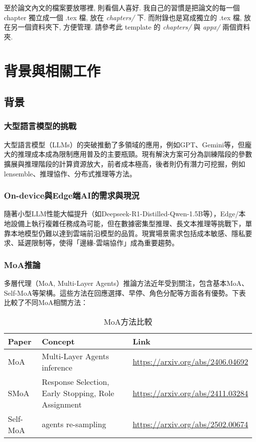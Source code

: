 至於論文內文的檔案要放哪裡, 則看個人喜好.
我自己的習慣是把論文的每一個 chapter 獨立成一個 .tex 檔, 放在 \textit{chapters/} 下.
而附錄也是寫成獨立的 .tex 檔, 放在另一個資料夾下, 方便管理.
請參考此 template 的 \textit{chapters/} 與 \textit{appx/} 兩個資料夾.

\chapter{背景與相關工作}

\section{背景}
\subsection{大型語言模型的挑戰}
大型語言模型（LLMs）的突破推動了多領域的應用，例如GPT、Gemini等，但龐大的推理成本成為限制應用普及的主要瓶頸。現有解決方案可分為訓練階段的參數擴展與推理階段的計算資源放大，前者成本極高，後者則仍有潛力可挖掘，例如lensemble、推理協作、分布式推理等方法。

\subsection{On-device與Edge端AI的需求與現況}
隨著小型LLM性能大幅提升（如Deepseek-R1-Distilled-Qwen-1.5B等），Edge/本地設備上執行複雜任務成為可能，但在數據密集型推理、長文本推理等挑戰下，單靠本地模型仍難以達到雲端前沿模型的品質。現實場景需求包括成本敏感、隱私要求、延遲限制等，使得「邊緣-雲端協作」成為重要趨勢。

\subsection{MoA推論}
多層代理（MoA, Multi-Layer Agents）推論方法近年受到關注，包含基本MoA、Self-MoA等架構。這些方法在回應選擇、早停、角色分配等方面各有優勢。下表比較了不同MoA相關方法：

\begin{table}[h]
\centering
\caption{MoA方法比較}
\begin{tabular}{|l|l|l|}
\hline
Paper & Concept & Link \\
\hline
MoA & Multi-Layer Agents inference & \url{https://arxiv.org/abs/2406.04692} \\
SMoA & Response Selection, Early Stopping, Role Assignment & \url{https://arxiv.org/abs/2411.03284} \\
Self-MoA & agents re-sampling & \url{https://arxiv.org/abs/2502.00674} \\
\hline
\end{tabular}
\end{table}

